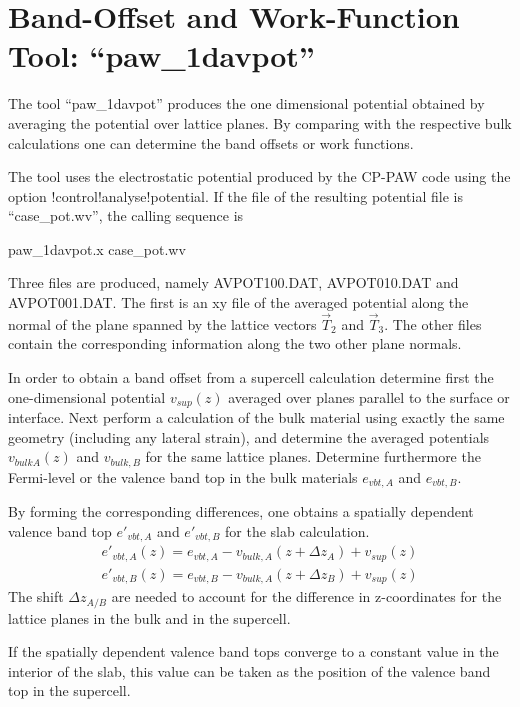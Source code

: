 \documentclass[final,12pt,makeidx,DIV=calc]{article}
\begin{document}
{{{{{{%
\newpage
\section{Band-Offset and Work-Function Tool: ``paw\_1davpot''}
\label{sec:1davpottool}
The tool ``paw\_1davpot'' produces the one dimensional potential
obtained by averaging the potential over lattice planes. By comparing
with the respective bulk calculations one can determine the band
offsets or work functions.

The tool uses the electrostatic potential produced by the CP-PAW code
using the option !control!analyse!potential. If the file of the
resulting potential file is ``case\_pot.wv'',  the calling sequence is
\begin{center}
paw\_1davpot.x case\_pot.wv
\end{center}
Three files are produced, namely AVPOT100.DAT, AVPOT010.DAT and
AVPOT001.DAT. The first is an xy file of the averaged potential along
the normal of the plane spanned by the lattice vectors $\vec{T}_2$ and
$\vec{T}_3$. The other files contain the corresponding information
along the two other plane normals.

In order to obtain a band offset from a supercell calculation
determine first the one-dimensional potential $v_{sup}(z)$ averaged
over planes parallel to the surface or interface. Next perform a
calculation of the bulk material using exactly the same geometry
(including any lateral strain), and determine the averaged potentials
$v_{bulk A}(z)$ and $v_{bulk,B}$ for the same lattice planes.
Determine furthermore the Fermi-level or the valence band top in the bulk
materials $e_{vbt,A}$ and $e_{vbt,B}$.

By forming the corresponding differences, one obtains a spatially
dependent valence band top $e'_{vbt,A}$ and $e'_{vbt,B}$ 
for the slab calculation.
\begin{eqnarray*}
e'_{vbt,A}(z)=e_{vbt,A}-v_{bulk,A}(z+\Delta z_A)+v_{sup}(z)
\\
e'_{vbt,B}(z)=e_{vbt,B}-v_{bulk,A}(z+\Delta z_B)+v_{sup}(z)
\end{eqnarray*}
The shift $\Delta z_{A/B}$ are needed to account for the difference in
z-coordinates for the lattice planes in the bulk and in the supercell.

If the spatially dependent valence band tops converge to a constant
value in the interior of the slab, this value can be taken as the
position of the valence band top in the supercell.
 

}}}}}}
\end{document}
